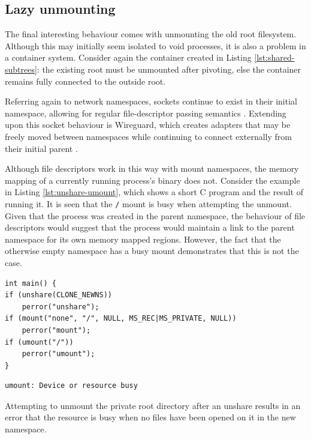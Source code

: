 \documentclass[12pt,a4paper,twoside]{report}
\begin{document}
\subsection{Lazy unmounting}
\label{sec:voiding-mount-lazy-unmount}

The final interesting behaviour comes with unmounting the old root filesystem. Although this may initially seem isolated to void processes, it is also a problem in a container system. Consider again the container created in Listing \ref{lst:shared-subtrees}: the existing root must be unmounted after pivoting, else the container remains fully connected to the outside root.

Referring again to network namespaces, sockets continue to exist in their initial namespace, allowing for regular file-descriptor passing semantics \citep{biederman_re_2007}. Extending upon this socket behaviour is Wireguard, which creates adapters that may be freely moved between namespaces while continuing to connect externally from their initial parent \citep[§7.3]{donenfeld_wireguard_2017}.

Although file descriptors work in this way with mount namespaces, the memory mapping of a currently running process's binary does not. Consider the example in Listing \ref{lst:unshare-umount}, which shows a short C program and the result of running it. It is seen that the \texttt{/} mount is busy when attempting the unmount. Given that the process was created in the parent namespace, the behaviour of file descriptors would suggest that the process would maintain a link to the parent namespace for its own memory mapped regions. However, the fact that the otherwise empty namespace has a busy mount demonstrates that this is not the case.

\begin{listing}
\begin{verbatim}
int main() {
if (unshare(CLONE_NEWNS))
	perror("unshare");
if (mount("none", "/", NULL, MS_REC|MS_PRIVATE, NULL))
	perror("mount");
if (umount("/"))
	perror("umount");
}
\end{verbatim}
\begin{verbatim}
umount: Device or resource busy
\end{verbatim}

\caption{Attempting to unmount the private root directory after an unshare results in an error that the resource is busy when no files have been opened on it in the new namespace.}
\label{lst:unshare-umount}
\end{listing}
\end{document}
